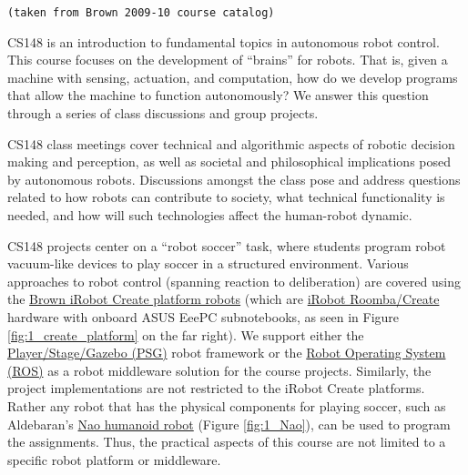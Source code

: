 \texttt{(taken from Brown 2009-10 course catalog)}

CS148 is an introduction to fundamental topics in autonomous robot control. This course focuses on the development of ``brains'' for robots. That is, given a machine with sensing, actuation, and computation, how do we develop programs that allow the machine to function autonomously? We answer this question through a series of class discussions and group projects.

CS148 class meetings cover technical and algorithmic aspects of robotic decision making and perception, as well as societal and philosophical implications posed by autonomous robots. Discussions amongst the class pose and address questions related to how robots can contribute to society, what technical functionality is needed, and how will such technologies affect the human-robot dynamic.

CS148 projects center on a ``robot soccer'' task, where students program robot vacuum-like devices to play soccer in a structured environment. Various approaches to robot control (spanning reaction to deliberation) are covered using the \href{http://robotics.cs.brown.edu/projects/smurv/}{Brown iRobot Create platform robots} (which are \href{http://www.irobot.com/sp.cfm?pageid=122}{iRobot Roomba/Create} hardware with onboard ASUS EeePC subnotebooks, as seen in Figure \ref{fig:1_create_platform} on the far right). We support either the \href{http://playerstage.sourceforge.net}{Player/Stage/Gazebo (PSG)} robot framework or the \href{http://www.ros.org/wiki/ROS/StartGuide}{Robot Operating System (ROS)} as a robot middleware solution for the course projects. Similarly, the project implementations are not restricted to the iRobot Create platforms. Rather any robot that has the physical components for playing soccer, such as Aldebaran's \href{http://www.aldebaran-robotics.com/eng/Nao.php}{Nao humanoid robot} (Figure \ref{fig:1_Nao}), can be used to program the assignments. Thus, the practical aspects of this course are not limited to a specific robot platform or middleware. 

